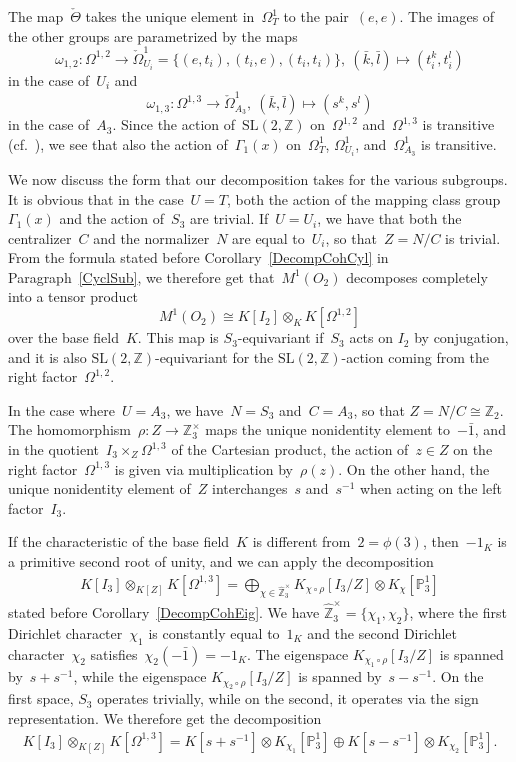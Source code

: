 \documentclass[12pt]{article}
\theoremstyle{definition}
\theoremstyle{break}
\newcommand{\Z}{\mathbb{Z}}
\newcommand{\SL}{\mathrm{SL}}
\renewcommand{\P}{\mathbb{P}}
\renewcommand{\1}{\mathbbm{1}}
\renewcommand{\P}{\mathbb{P}}
\newcommand{\ot}{\mathbin{\otimes}}
\begin{document}
The map~$\check{\Theta}$ takes the unique element in~$\Omega^1_T$ to the pair~$(e,e)$. The images of the other groups are parametrized by the maps
\[\omega_{1,2} \colon \Omega^{1,2} \to \check{\Omega}^1_{U_i} = \{(e,t_i), (t_i,e), (t_i, t_i)\},~(\bar{k},\bar{l}) \mapsto (t_i^k, t_i^l) \]
in the case of~$U_i$ and
\[\omega_{1,3} \colon \Omega^{1,3} \to \check{\Omega}^1_{A_3},~(\bar{k},\bar{l}) \mapsto (s^k,s^l) \]
in the case of~$A_3$. Since the action of~$\SL(2, \Z)$ on~$\Omega^{1,2}$ and~$\Omega^{1,3}$ is transitive (cf.~\cite[Kap.~II, Satz~6.14, p.~183]{Hu}), we see that also the action of~$\Gamma_1(x)$ on~$\Omega^1_{T}$, $\Omega^1_{U_i}$, and~$\Omega^1_{A_3}$ is transitive.

We now discuss the form that our decomposition takes for the various subgroups. It is obvious that in the case~$U=T$, both the action of the mapping class
group~$\Gamma_1(x)$ and the action of~$S_3$ are trivial. If~$U=U_i$, we have that both the centralizer~$C$ and the normalizer~$N$ are equal to~$U_i$, so that~$Z=N/C$ is trivial. From the formula stated before Corollary~\ref{DecompCohCyl} in Paragraph~\ref{CyclSub}, we therefore get that~$M^1(O_2)$ decomposes completely into a tensor product
\[M^1(O_2) \cong K[I_2] \otimes_{K} K[\Omega^{1,2}]\]
over the base field~$K$. This map is $S_3$-equivariant if~$S_3$ acts on $I_2$ by conjugation, and it is also \mbox{$\SL(2, \Z)$-equi}\-variant for the $\SL(2, \Z)$-action coming from the right factor~$\Omega^{1,2}$.

In the case where~$U = A_3$, we have~$N = S_3$ and~$C = A_3$, so that \mbox{$Z=N/C \cong \Z_2$}.
The homomorphism~$\rho \colon Z \to \Z_3^\times$ maps the unique nonidentity element to~$-\bar{1}$, and in the quotient~$I_3 \times_Z \Omega^{1,3}$ of the Cartesian product, the action of~$z \in Z$ on the right factor~$\Omega^{1,3}$ is given via multiplication by~$\rho(z)$. On the other hand, the unique nonidentity element of~$Z$ interchanges~$s$ and~$s^{-1}$ when acting on the left factor~$I_3$.

If the characteristic of the base field~$K$ is different from~$2 = \phi(3)$, then~$-1_K$ is a primitive second root of unity, and we can apply the decomposition
\begin{align*}
K[I_3] \ot_{K[Z]} K[\Omega^{1,3}]
= \bigoplus_{\chi \in \hat{\Z}_3^\times}
K_{\chi \circ \rho}[I_3/Z] \ot K_\chi[\P_3^{1}]
\end{align*}
stated before Corollary~\ref{DecompCohEig}. We have $\hat{\Z}_3^\times = \{\chi_1, \chi_2\}$, where the first Dirichlet character~$\chi_1$ is constantly equal to~$1_K$ and the second Dirichlet character~$\chi_2$ satisfies~$\chi_2(-\bar{1}) = -1_K$. The eigenspace
$K_{\chi_1 \circ \rho}[I_3/Z]$ is spanned by~$s + s^{-1}$, while the eigenspace
$K_{\chi_2 \circ \rho}[I_3/Z]$ is spanned by~$s - s^{-1}$. On the first space, $S_3$ operates trivially, while on the second, it operates via the sign representation. We therefore get the decomposition
\begin{align*}
K[I_3] \ot_{K[Z]} K[\Omega^{1,3}]
= K[s + s^{-1}] \ot K_{\chi_1}[\P_3^{1}]
\oplus K[s - s^{-1}] \ot K_{\chi_2}[\P_3^{1}].
\end{align*}
\end{document}
